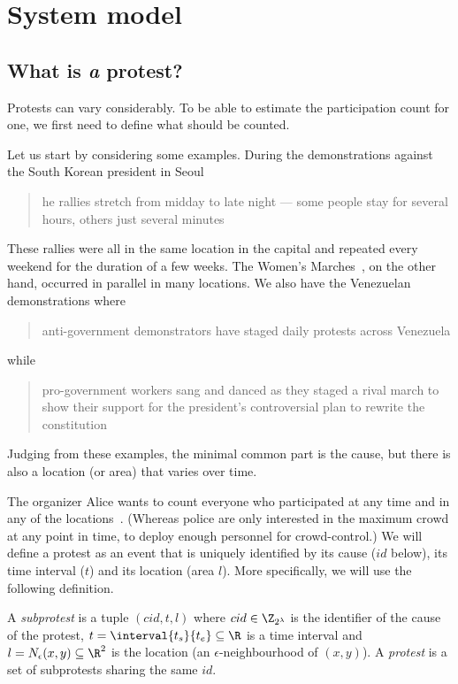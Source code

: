 \section{System model}%
\label{SystemModel}

\subsection{What is \protect\emph{a} protest?}%
\label{WhatIsAProtest}

Protests can vary considerably.
To be able to estimate the participation count for one, we first need to define
what should be counted.

Let us start by considering some examples.
During the demonstrations against the South Korean president in Seoul
\blockcquote{2016DemonstrationsInSeoul}{%
  he rallies stretch from midday to late night --- some 
  people stay for several hours, others just several minutes%
}.
These rallies were all in the same location in the capital and repeated every 
weekend for the duration of a few weeks.
The Women's Marches~\cite{2017WomensMarchesInUS}, on the other hand, occurred 
in parallel in many locations.
We also have the Venezuelan demonstrations where
\blockcquote{2017VenezuelaProtestFrequency}{%
  anti-government demonstrators have staged daily protests across Venezuela%
} while
\blockcquote{AlJazeeraOnVenezuela2017}{%
  pro-government workers sang and danced as they staged a rival march to show 
  their support for the president's controversial plan to rewrite the 
  constitution%
}.
Judging from these examples, the minimal common part is the cause,%
\label{CauseIsTheCommonDenominator}
but there is also a location (or area) that varies over time.

The organizer Alice wants to count everyone who participated at any time and in 
any of the locations~\cite{2016DemonstrationsInSeoul}.
(Whereas police are only interested in the maximum crowd at any point in time, 
to deploy enough personnel for crowd-control.)
We will define a protest as an event that is uniquely identified by its cause 
(\(id\) below), its time interval (\(t\)) and its location (area \(l\)).
More specifically, we will use the following definition.

\begin{definition}[Protest]\label{DefProtest}
  A \emph{subprotest} is a tuple \((cid, t, l)\) where
  \(cid\in \Z_{2^\lambda}\) is the identifier of the cause of the protest,
  \(t = \interval{t_s}{t_e}\subseteq \R\) is a time interval and
  \(l = N_\epsilon(x, y)\subseteq \R^2\) is the location (an 
  \(\epsilon\)-neighbourhood of \((x,y)\)).
  A \emph{protest} is a set of subprotests sharing the same \(id\).
\end{definition}

